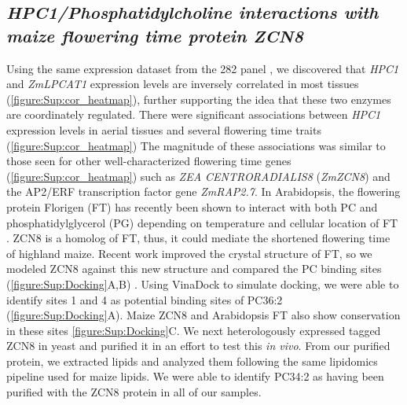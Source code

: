 \documentclass[9pt,twocolumn,twoside,lineno]{biorxiv}
\newcommand{\hpc}{\textit{HPC1}\xspace}
\begin{document}
\subsection{\textit{HPC1/Phosphatidylcholine interactions with maize flowering time protein ZCN8}}
Using the same expression dataset from the 282 panel \cite{Kremling2018-gn}, we discovered that \hpc and \textit{ZmLPCAT1} expression levels are inversely correlated in most tissues (\cref{figure:Sup:cor_heatmap}), further supporting the idea that these two enzymes are coordinately regulated.
There were significant associations between \hpc expression levels in aerial tissues and several flowering time traits (\cref{figure:Sup:cor_heatmap})
The magnitude of these associations was similar to those seen for other well-characterized flowering time genes (\cref{figure:Sup:cor_heatmap}) such as \textit{ZEA CENTRORADIALIS8} (\textit{ZmZCN8})  and the AP2/ERF transcription factor gene \textit{ZmRAP2.7}.  
In Arabidopsis, the flowering protein Florigen (FT) has recently been shown to interact with both PC and phosphatidylglycerol (PG) depending on temperature and cellular location of FT \cite{Nakamura2014-qf, Susila2021-dz}.
ZCN8 is a homolog of FT, thus, it could mediate the shortened flowering time of highland maize. 
Recent work improved the crystal structure of FT, so we modeled ZCN8 against this new structure and compared the PC binding sites (\cref{figure:Sup:Docking}A,B) \cite{Nakamura2019-ht}. 
Using VinaDock to simulate docking, we were able to identify sites 1 and 4 as potential binding sites of PC36:2 (\cref{figure:Sup:Docking}A).
Maize ZCN8 and  Arabidopsis FT also show conservation in these sites \cref{figure:Sup:Docking}C. 
We next heterologously expressed tagged ZCN8 in yeast and purified it in an effort to test this \textit{in vivo}. 
From our purified protein, we extracted lipids and analyzed them following the same lipidomics pipeline used for maize lipids. 
We were able to identify PC34:2 as having been purified with the ZCN8 protein in all of our samples.
\end{document}
